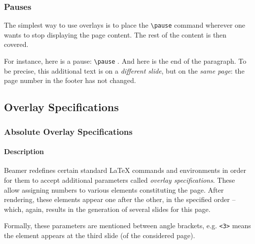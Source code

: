 \documentclass[10pt,    %
    english,            %
    xcolor=table,       %
    envcountsect,        %
    aspectratio=169     %
]{beamer}
\begin{document}
\begin{frame}
    \frametitle{Pauses}
    
    The simplest way to use overlays is to place the \texttt{\textbackslash{}pause} command wherever one wants to stop displaying the page content. The rest of the content is then covered.
    
    \vspace{0.25cm}
    For instance, here is a pause: \texttt{\textbackslash{}pause} \pause. And here is the end of the paragraph. To be precise, this additional text is on a \textit{different slide}, but on the \textit{same page}: the page number in the footer has not changed.
    
    \vspace{0.25cm}
\end{frame}

\subsection{Overlay Specifications}
\begin{frame}
    \frametitle{Absolute Overlay Specifications}
    \framesubtitle{Description}
    
    Beamer redefines certain standard \LaTeX{} commands and environments in order for them to accept additional parameters called \textit{overlay specifications}. These allow assigning numbers to various elements constituting the page. After rendering, these elements appear one after the other, in the specified order --which, again, results in the generation of several slides for this page.
    
    \vspace{0.25cm}
    Formally, these parameters are mentioned between angle brackets, e.g. \texttt{<3>} means the element appears at the third slide (of the considered page).   
\end{frame}
\end{document}
